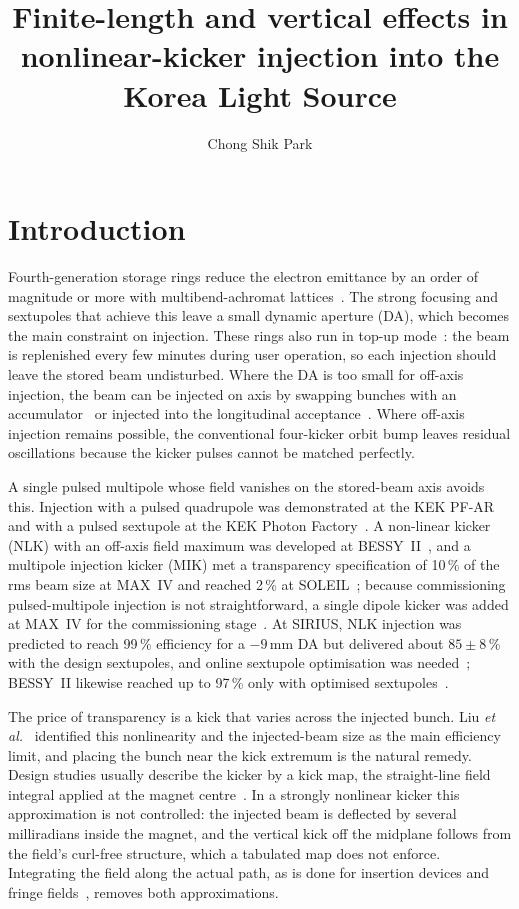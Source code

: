 \documentclass[a4paper,11pt]{article}
\title{Finite-length and vertical effects in nonlinear-kicker injection into the Korea Light Source}
\author[a,1]{Chong Shik Park\note{Corresponding author.}}
\affiliation[a]{Department of Accelerator Science and Center for Accelerator Research, Korea University,\\Sejong 30019, Republic of Korea}
\begin{document}
\maketitle
\flushbottom
\linenumbers

\section{Introduction}
\label{sec:intro}

Fourth-generation storage rings reduce the electron emittance by an order of magnitude or more with multibend-achromat lattices~\cite{Hettel2014,Raimondi2021}. The strong focusing and sextupoles that achieve this leave a small dynamic aperture (DA), which becomes the main constraint on injection. These rings also run in top-up mode~\cite{Emery1999}: the beam is replenished every few minutes during user operation, so each injection should leave the stored beam undisturbed. Where the DA is too small for off-axis injection, the beam can be injected on axis by swapping bunches with an accumulator~\cite{Emery2003} or injected into the longitudinal acceptance~\cite{Aiba2015}. Where off-axis injection remains possible, the conventional four-kicker orbit bump leaves residual oscillations because the kicker pulses cannot be matched perfectly.

A single pulsed multipole whose field vanishes on the stored-beam axis avoids this. Injection with a pulsed quadrupole was demonstrated at the KEK PF-AR~\cite{Harada2007} and with a pulsed sextupole at the KEK Photon Factory~\cite{Takaki2010}. A non-linear kicker (NLK) with an off-axis field maximum was developed at BESSY~II~\cite{Atkinson2011,Gora2023}, and a multipole injection kicker (MIK) met a transparency specification of 10\,\% of the rms beam size at MAX~IV and reached 2\,\% at SOLEIL~\cite{Alexandre2021,Kallestrup2019,Ollier2023}; because commissioning pulsed-multipole injection is not straightforward, a single dipole kicker was added at MAX~IV for the commissioning stage~\cite{Leemann2012}. At SIRIUS, NLK injection was predicted to reach 99\,\% efficiency for a $-9$\,mm DA but delivered about $85\pm8$\,\% with the design sextupoles, and online sextupole optimisation was needed~\cite{Liu2016,Velloso2023}; BESSY~II likewise reached up to 97\,\% only with optimised sextupoles~\cite{Gora2023}.

The price of transparency is a kick that varies across the injected bunch. Liu \emph{et al.}~\cite{Liu2016} identified this nonlinearity and the injected-beam size as the main efficiency limit, and placing the bunch near the kick extremum is the natural remedy. Design studies usually describe the kicker by a kick map, the straight-line field integral applied at the magnet centre~\cite{Elleaume1992}. In a strongly nonlinear kicker this approximation is not controlled: the injected beam is deflected by several milliradians inside the magnet, and the vertical kick off the midplane follows from the field's curl-free structure, which a tabulated map does not enforce. Integrating the field along the actual path, as is done for insertion devices and fringe fields~\cite{Wu2003}, removes both approximations.
\end{document}
